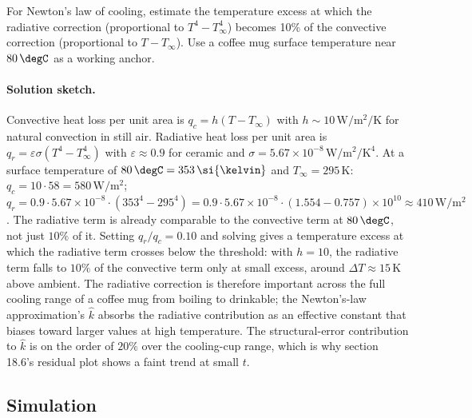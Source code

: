 \begin{exercise}
For Newton's law of cooling, estimate the temperature excess at
which the radiative correction (proportional to $T^{4} -
T_{\infty}^{4}$) becomes 10\% of the convective correction
(proportional to $T - T_{\infty}$). Use a coffee mug surface
temperature near $80\,\degC$ as a working anchor.

\paragraph{Solution sketch.} Convective heat loss per unit area is
$q_{c} = h (T - T_{\infty})$ with $h \sim 10\,\si{\watt\per\square\meter\per\kelvin}$
for natural convection in still air. Radiative heat loss per unit
area is $q_{r} = \varepsilon \sigma (T^{4} - T_{\infty}^{4})$ with
$\varepsilon \approx 0.9$ for ceramic and $\sigma = 5.67 \times
10^{-8}\,\si{\watt\per\square\meter\per\kelvin\tothe{4}}$. At a
surface temperature of $80\,\degC = 353\,\si{\kelvin}$ and
$T_{\infty} = 295\,\si{\kelvin}$:
$q_{c} = 10 \cdot 58 = 580\,\si{\watt\per\square\meter}$;
$q_{r} = 0.9 \cdot 5.67\times 10^{-8} \cdot (353^{4} - 295^{4})
= 0.9 \cdot 5.67\times 10^{-8} \cdot (1.554 - 0.757)\times 10^{10}
\approx 410\,\si{\watt\per\square\meter}$.
The radiative term is already comparable to the convective term at
$80\,\degC$, not just $10\%$ of it. Setting $q_{r}/q_{c} = 0.10$
and solving gives a temperature excess at which the radiative term
crosses below the threshold: with $h = 10$, the radiative term
falls to $10\%$ of the convective term only at small excess, around
$\Delta T \approx 15\,\si{\kelvin}$ above ambient. The radiative
correction is therefore important across the full cooling range
of a coffee mug from boiling to drinkable; the Newton's-law
approximation's $\hat k$ absorbs the radiative contribution as an
effective constant that biases toward larger values at high
temperature. The structural-error contribution to $\hat k$ is on
the order of $20\%$ over the cooling-cup range, which is why
section 18.6's residual plot shows a faint trend at small $t$.
\end{exercise}

\subsection*{Simulation}

